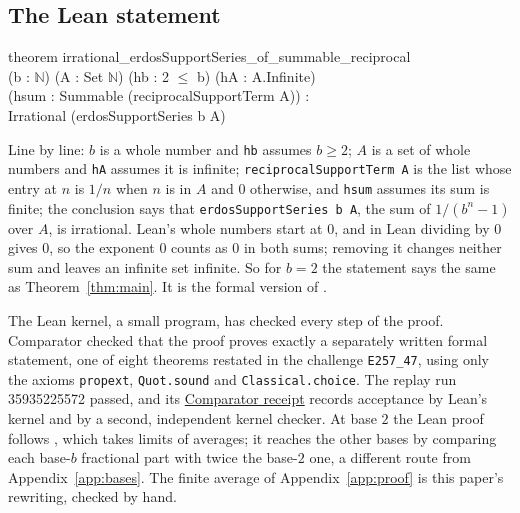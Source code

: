 \documentclass[10pt]{article}
\theoremstyle{plain}
\theoremstyle{definition}
\theoremstyle{remark}
\begin{document}
\subsection{The Lean statement}\label{app:lean}

\begin{center}
\begin{minipage}{0.9\linewidth}
\small\ttfamily
theorem irrational\_erdosSupportSeries\_of\_summable\_reciprocal\\
\hspace*{2em}(b : $\mathbb{N}$) (A : Set $\mathbb{N}$) (hb : 2 $\le$ b) (hA : A.Infinite)\\
\hspace*{2em}(hsum : Summable (reciprocalSupportTerm A)) :\\
\hspace*{2em}Irrational (erdosSupportSeries b A)
\end{minipage}
\end{center}
Line by line: $b$ is a whole number and \texttt{hb} assumes $b\ge2$; $A$ is a
set of whole numbers and \texttt{hA} assumes it is infinite;
\texttt{reciprocalSupportTerm A} is the list whose entry at $n$ is $1/n$ when
$n$ is in $A$ and $0$ otherwise, and \texttt{hsum} assumes its sum is finite;
the conclusion says that \texttt{erdosSupportSeries b A}, the sum of
$1/(b^n-1)$ over $A$, is irrational. Lean's whole numbers start at $0$, and in
Lean dividing by $0$ gives $0$, so the exponent $0$ counts as $0$ in both sums;
removing it changes neither sum and leaves an infinite set infinite. So for
$b=2$ the statement says the same as Theorem~\ref{thm:main}. It is the formal
version of \cite[Theorem~A.1]{shortpaper}.

The Lean kernel, a small program, has checked every step of the proof.
Comparator checked that the proof proves exactly a separately written formal
statement, one of eight theorems restated in the challenge
\texttt{E257\_47}, using only the axioms \texttt{propext},
\texttt{Quot.sound} and \texttt{Classical.choice}. The replay run 35935225572
passed, and its
\href{https://github.com/wcook04/plectis-erdos/blob/0064fc9b2a2693de97aebc8abec26090c3cd1095/evidence/comparator/replay-35935225572/receipt-E257_47.json}{Comparator receipt}
records acceptance by Lean's kernel and by a second, independent kernel
checker. At base $2$ the Lean proof follows \cite[Appendix~A]{shortpaper},
which takes limits of averages; it reaches the other bases by comparing each
base-$b$ fractional part with twice the base-$2$ one, a different route from
Appendix~\ref{app:bases}. The finite average of Appendix~\ref{app:proof} is
this paper's rewriting, checked by hand.
\end{document}
